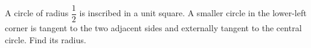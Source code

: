 A circle of radius $\dfrac{1}{2}$ is inscribed in a unit square. A smaller circle in the lower-left corner is tangent to the two adjacent sides and externally tangent to the central circle. Find its radius.
